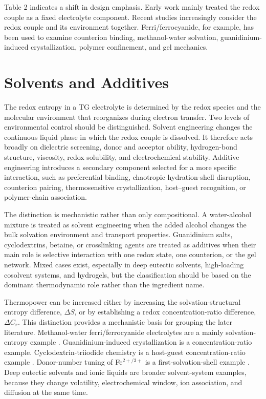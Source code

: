 \documentclass[a4paper,12pt]{report}
\begin{document}
Table 2 indicates a shift in design emphasis. Early work mainly treated the
redox couple as a fixed electrolyte component. Recent studies increasingly
consider the redox couple and its environment together. Ferri/ferrocyanide, for
example, has been used to examine counterion binding, methanol-water solvation,
guanidinium-induced crystallization, polymer confinement, and gel mechanics.

\section{Solvents and Additives}

The redox entropy in a TG electrolyte is determined by the redox species and
the molecular environment that reorganizes during electron transfer. Two levels
of environmental control should be distinguished. Solvent engineering changes
the continuous liquid phase in which the redox couple is dissolved. It therefore
acts broadly on dielectric screening, donor and acceptor ability,
hydrogen-bond structure, viscosity, redox solubility, and electrochemical
stability. Additive engineering introduces a secondary component selected for a
more specific interaction, such as preferential binding, chaotropic
hydration-shell disruption, counterion pairing, thermosensitive crystallization,
host--guest recognition, or polymer-chain association.

The distinction is mechanistic rather than only compositional. A water-alcohol
mixture is treated as solvent engineering when the added alcohol changes the
bulk solvation environment and transport properties. Guanidinium salts,
cyclodextrins, betaine, or crosslinking agents are treated as additives when
their main role is selective interaction with one redox state, one counterion,
or the gel network. Mixed cases exist, especially in deep eutectic solvents,
high-loading cosolvent systems, and hydrogels, but the classification should be
based on the dominant thermodynamic role rather than the ingredient name.

Thermopower can be increased either by increasing the solvation-structural
entropy difference, $\Delta S$, or by establishing a redox concentration-ratio
difference, $\Delta C_r$. This distinction provides a
mechanistic basis for grouping the later literature. Methanol-water ferri/ferrocyanide electrolytes
are a mainly solvation-entropy example \citep{kim2017high}. Guanidinium-induced crystallization is
a concentration-ratio example. Cyclodextrin-triiodide chemistry is a
host-guest concentration-ratio example \citep{yu2020thermosensitive,
zhou2016supramolecular}. Donor-number tuning of Fe$^{2+/3+}$ is
a first-solvation-shell example \citep{chen2023solvation}. Deep eutectic solvents and ionic liquids are
broader solvent-system examples, because they change volatility,
electrochemical window, ion association, and diffusion at the same time.
\end{document}
